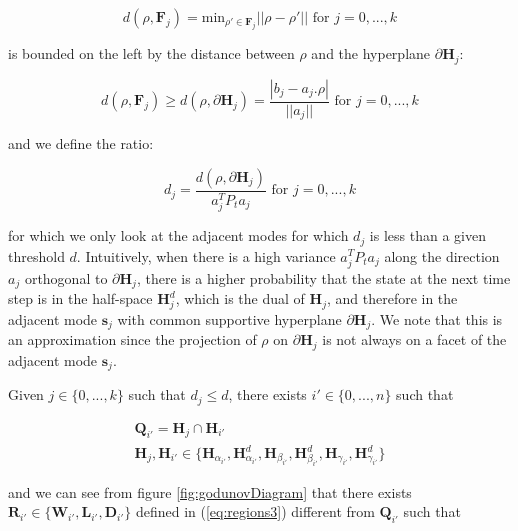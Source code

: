 \documentclass[11pt]{article}
\numberwithin{equation}{section}
\numberwithin{figure}{section}
\numberwithin{table}{section}
\begin{document}
\begin{equation}
d(\rho,\textbf{F}_{j}) = \text{min}_{\rho'\in \textbf{F}_{j}} ||\rho-\rho'|| \text{ for }j=0,...,k
\label{eq:distance}
\end{equation}

\noindent is bounded on the left by the distance between $\rho$ and the hyperplane $\partial\textbf{H}_{j}$:

\begin{equation}
d(\rho,\textbf{F}_{j})\geq d(\rho,\partial\textbf{H}_{j})=\frac{|b_{j}-a_{j}.\rho|}{||a_{j}||} \text{ for }j=0,...,k
\label{eq:lowerBound}
\end{equation}

\noindent and we define the ratio:

\begin{equation}
d_{j}=\frac{d(\rho,\partial\textbf{H}_{j})}{a^{T}_{j} P_{t} a_{j}}\text{ for }j=0,...,k
\label{eq:ratio}
\end{equation}

\noindent for which we only look at the adjacent modes for which $d_{j}$ is less than a given threshold $d$. Intuitively, when there is a high variance $a^{T}_{j} P_{t} a_{j}$ along the direction $a_{j}$ orthogonal to $\partial\textbf{H}_{j}$, there is a higher probability that the state at the next time step is in the half-space $\textbf{H}^{d}_{j}$, which is the dual of $\textbf{H}_{j}$, and therefore in the adjacent mode $\boldsymbol s_{j}$ with common supportive hyperplane $\partial\textbf{H}_{j}$. We note that this is an approximation since the projection of $\rho$ on $\partial\textbf{H}_{j}$ is not always on a facet of the adjacent mode $\boldsymbol s_{j}$.

Given $j\in\{0,...,k\}$ such that $d_{j}\leq d$, there exists $i'\in\{0,...,n\}$ such that

\begin{equation}
\begin{array}{l}
\textbf{Q}_{i'}=\textbf{H}_{j}\cap \textbf{H}_{i'}\\
\textbf{H}_{j}, \textbf{H}_{i'}\in \{\textbf{H}_{\alpha_{i'}}, \textbf{H}^{d}_{\alpha_{i'}}, \textbf{H}_{\beta_{i'}}, \textbf{H}^{d}_{\beta_{i'}}, \textbf{H}_{\gamma_{i'}}, \textbf{H}^{d}_{\gamma_{i'}}\}
\end{array}
\label{eq:modeSearch1}
\end{equation}

\noindent and we can see from figure \ref{fig:godunovDiagram} that there exists $\textbf{R}_{i'} \in \{\textbf{W}_{i'}, \textbf{L}_{i'}, \textbf{D}_{i'}\}$ defined in (\ref{eq:regions3}) different from $\textbf{Q}_{i'}$ such that
\end{document}

